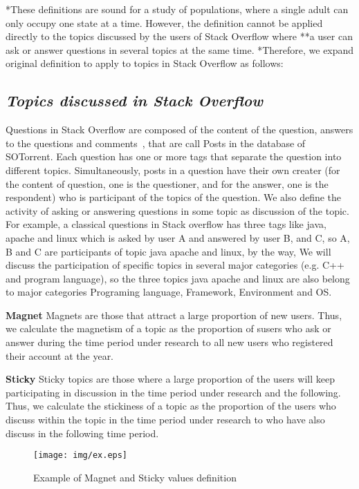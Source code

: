 \documentclass[conference]{IEEEtran}
\begin{document}
*These definitions are sound for a study of populations, where a single adult can only occupy one state at a time. However, the definition cannot be applied directly to the topics discussed by the users of Stack Overflow where **a user can ask or answer questions in several topics at the same time. *Therefore, we expand original definition to apply to topics in Stack Overflow as follows:

\smallskip
\subsection*{\textit{\textbf{Topics discussed in Stack Overflow}}}

Questions in Stack Overflow are composed of the content of the question, answers to the questions and comments~\cite{liu2018mining}, that are call Posts in the database of SOTorrent. Each question has one or more tags that separate the question into different topics. Simultaneously, posts in a question have their own creater (for the content of question, one is the questioner, and for the answer, one is the respondent) who is participant of the topics of the question. We also define the activity of asking or answering questions in some topic as discussion of the topic. For example, a classical questions in Stack overflow has three tags like java, apache and linux which is asked by user A and answered by user B, and C, so A, B and C are participants of topic java apache and linux, by the way, We will discuss the participation of specific topics in several major categories (e.g. C++ and program language), so the three topics java apache and linux are also belong to major categories Programing language, Framework, Environment and OS.
\smallskip

\textbf{Magnet}
Magnets are those that attract a large proportion of new users. Thus, we calculate the magnetism of a topic as the proportion of susers who ask or answer during the time period under research to all new users who registered their account at the year.
\smallskip
\smallskip

\textbf{Sticky}
Sticky topics are those where a large proportion of the users will keep participating in discussion in the time period under research and the following. Thus, we calculate the stickiness of a topic as the proportion of the users who discuss within the topic in the time period under research to who have also discuss in the following time period.

\begin{figure}[t]
 \centering
 \texttt{[image: img/ex.eps]}  
 \caption{Example of Magnet and Sticky values definition} 
 \label{fig:example2} 
\end{figure}
\smallskip
\smallskip
\end{document}
